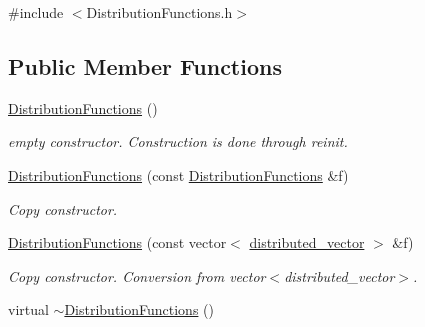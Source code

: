 {\ttfamily \#include $<$DistributionFunctions.h$>$}\subsection*{Public Member Functions}
\begin{DoxyCompactItemize}
\item 
\hypertarget{classnatrium_1_1DistributionFunctions_a4fc9c42637465355a9df7681d45340c9}{
\hyperlink{classnatrium_1_1DistributionFunctions_a4fc9c42637465355a9df7681d45340c9}{DistributionFunctions} ()}
\label{classnatrium_1_1DistributionFunctions_a4fc9c42637465355a9df7681d45340c9}

\begin{DoxyCompactList}\small\item\em empty constructor. Construction is done through reinit. \item\end{DoxyCompactList}\item 
\hypertarget{classnatrium_1_1DistributionFunctions_af0a970355419acf79be898e573f3149a}{
\hyperlink{classnatrium_1_1DistributionFunctions_af0a970355419acf79be898e573f3149a}{DistributionFunctions} (const \hyperlink{classnatrium_1_1DistributionFunctions}{DistributionFunctions} \&f)}
\label{classnatrium_1_1DistributionFunctions_af0a970355419acf79be898e573f3149a}

\begin{DoxyCompactList}\small\item\em Copy constructor. \item\end{DoxyCompactList}\item 
\hypertarget{classnatrium_1_1DistributionFunctions_a0ea3ad0426df18a986578f7b57361dd3}{
\hyperlink{classnatrium_1_1DistributionFunctions_a0ea3ad0426df18a986578f7b57361dd3}{DistributionFunctions} (const vector$<$ \hyperlink{namespacenatrium_a903d2b92917f582f2ff05f52160ab811}{distributed\_\-vector} $>$ \&f)}
\label{classnatrium_1_1DistributionFunctions_a0ea3ad0426df18a986578f7b57361dd3}

\begin{DoxyCompactList}\small\item\em Copy constructor. Conversion from vector$<$distributed\_\-vector$>$. \item\end{DoxyCompactList}\item 
\hypertarget{classnatrium_1_1DistributionFunctions_af965a46fbf124e8f90250c843e615bcd}{
virtual \hyperlink{classnatrium_1_1DistributionFunctions_af965a46fbf124e8f90250c843e615bcd}{$\sim$DistributionFunctions} ()}
\label{classnatrium_1_1DistributionFunctions_af965a46fbf124e8f90250c843e615bcd}


\end{DoxyCompactItemize}
